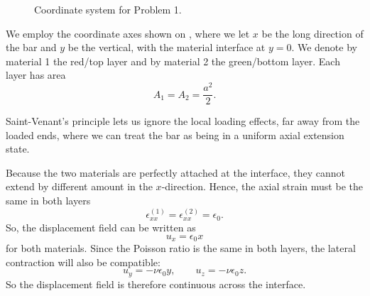   \begin{derivation}
    \begin{figure}[ht]
        \renewcommand{\thefigure}{3.1}
        \centering
        \caption{Coordinate system for Problem 1.}
        \label{fig:ass3_1_1}
    \end{figure}
    \addtocounter{figure}{-1}

    We employ the coordinate axes shown on , where we let $x$ be the long direction of the bar and $y$ be the vertical, with the material interface at $y = 0$.
    We denote by material 1 the red/top layer and by material 2 the green/bottom layer.
    Each layer has area
    \begin{equation} \label{eq:31area}
      A_1 = A_2 = \frac{a^2}{2}
    .\end{equation}
    
    Saint-Venant's principle lets us ignore the local loading effects, far away from the loaded ends, where we can treat the bar as being in a uniform axial extension state.

    Because the two materials are perfectly attached at the interface, they cannot extend by different amount in the $x$-direction.
    Hence, the axial strain must be the same in both layers
    \begin{equation*}
      \epsilon_{x x}^{(1)} = \epsilon_{x x}^{(2)} = \epsilon_0
    .\end{equation*}
    So, the displacement field can be written as
    \begin{equation} \label{eq:31disx}
      u_x = \epsilon_0 x
    \end{equation}
    for both materials.
    Since the Poisson ratio is the same in both layers, the lateral contraction will also be compatible:
    \begin{equation} \label{eq:31disyz}
      u_y = - \nu \epsilon_0 y, \qquad u_z = - \nu \epsilon_0 z
    .\end{equation}
    So the displacement field is therefore continuous across the interface.


\end{derivation}
